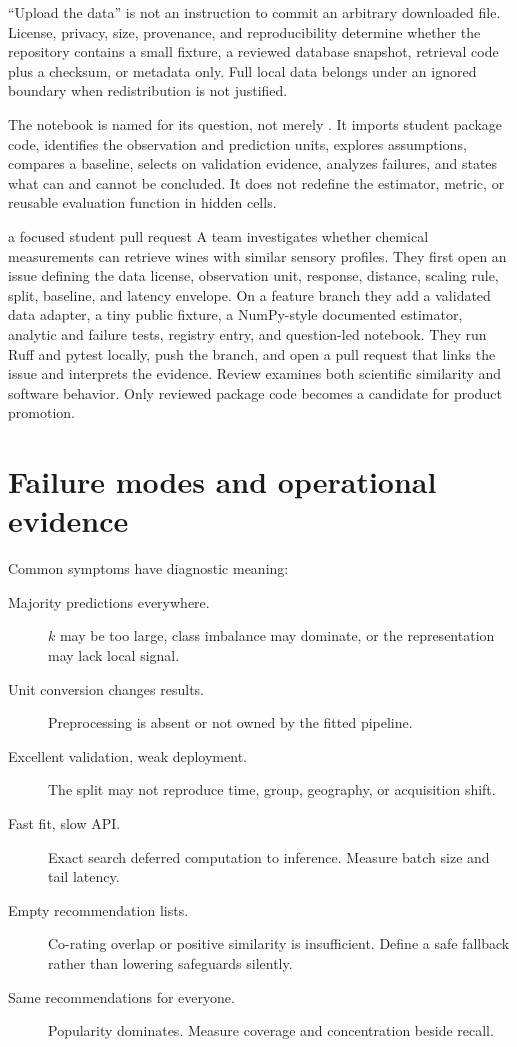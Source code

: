``Upload the data'' is not an instruction to commit an arbitrary downloaded
file. License, privacy, size, provenance, and reproducibility determine whether
the repository contains a small fixture, a reviewed database snapshot,
retrieval code plus a checksum, or metadata only. Full local data belongs under
an ignored boundary when redistribution is not justified.

The notebook is named for its question, not merely . It imports
student package code, identifies the observation and prediction units, explores
assumptions, compares a baseline, selects on validation evidence, analyzes
failures, and states what can and cannot be concluded. It does not redefine the
estimator, metric, or reusable evaluation function in hidden cells.

\begin{workedexample}{a focused student pull request}
A team investigates whether chemical measurements can retrieve wines with
similar sensory profiles. They first open an issue defining the data license,
observation unit, response, distance, scaling rule, split, baseline, and
latency envelope. On a feature branch they add a validated data adapter, a tiny
public fixture, a NumPy-style documented estimator, analytic and failure tests,
registry entry, and question-led notebook. They run Ruff and pytest locally,
push the branch, and open a pull request that links the issue and interprets
the evidence. Review examines both scientific similarity and software behavior.
Only reviewed package code becomes a candidate for product promotion.
\end{workedexample}

\section{Failure modes and operational evidence}

Common symptoms have diagnostic meaning:
\begin{description}
  \item[Majority predictions everywhere.] $k$ may be too large, class imbalance
  may dominate, or the representation may lack local signal.
  \item[Unit conversion changes results.] Preprocessing is absent or not owned
  by the fitted pipeline.
  \item[Excellent validation, weak deployment.] The split may not reproduce
  time, group, geography, or acquisition shift.
  \item[Fast fit, slow API.] Exact search deferred computation to inference.
  Measure batch size and tail latency.
  \item[Empty recommendation lists.] Co-rating overlap or positive similarity
  is insufficient. Define a safe fallback rather than lowering safeguards
  silently.
  \item[Same recommendations for everyone.] Popularity dominates. Measure
  coverage and concentration beside recall.
\end{description}

